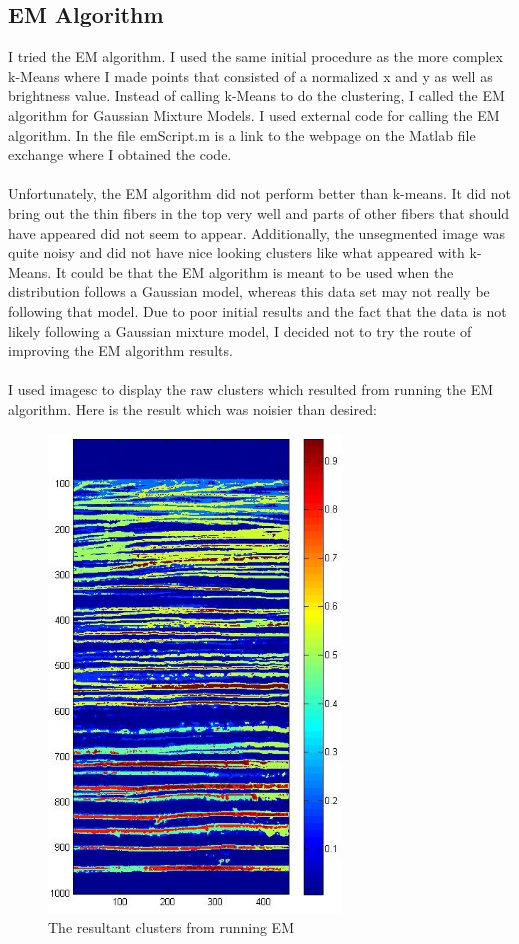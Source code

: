 \documentclass[11pt,psfig]{article}
\begin{document}
\subsection{EM Algorithm}
I tried the EM algorithm. I used the same initial procedure as the more complex k-Means where I made points that consisted of a normalized x and y as well as brightness value. Instead of calling k-Means to do the clustering, I called the EM algorithm for Gaussian Mixture Models. I used external code for calling the EM algorithm. In the file emScript.m is a link to the webpage on the Matlab file exchange where I obtained the code. \\
\\
Unfortunately, the EM algorithm did not perform better than k-means. It did not bring out the thin fibers in the top very well and parts of other fibers that should have appeared did not seem to appear. Additionally, the unsegmented image was quite noisy and did not have nice looking clusters like what appeared with k-Means. It could be that the EM algorithm is meant to be used when the distribution follows a Gaussian model, whereas this data set may not really be following that model. Due to poor initial results and the fact that the data is not likely following a Gaussian mixture model, I decided not to try the route of improving the EM algorithm results. \\
\\
I used imagesc to display the raw clusters which resulted from running the EM algorithm. Here is the result which was noisier than desired:
\begin{figure}[H]
\centering
\includegraphics[height=5in]{emResultUnsegmented.jpg}
\caption{The resultant clusters from running EM}
\end{figure}
\end{document}
